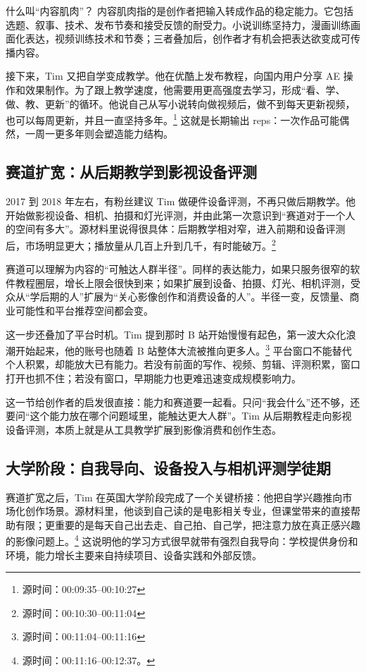 \documentclass[a4paper]{article}
\begin{document}
\begin{knowledgebox}{什么叫“内容肌肉”？}
内容肌肉指的是创作者把输入转成作品的稳定能力。它包括选题、叙事、技术、发布节奏和接受反馈的耐受力。小说训练坚持力，漫画训练画面化表达，视频训练技术和节奏；三者叠加后，创作者才有机会把表达欲变成可传播内容。
\end{knowledgebox}

接下来，Tim 又把自学变成教学。他在优酷上发布教程，向国内用户分享 AE 操作和效果制作。为了跟上教学速度，他需要用更高强度去学习，形成“看、学、做、教、更新”的循环。他说自己从写小说转向做视频后，做不到每天更新视频，也可以每周更新，并且一直坚持多年。\footnote{源时间：00:09:35--00:10:27} 这就是长期输出 reps：一次作品可能偶然，一周一更多年则会塑造能力结构。

\subsection{赛道扩宽：从后期教学到影视设备评测}

2017 到 2018 年左右，有粉丝建议 Tim 做硬件设备评测，不再只做后期教学。他开始做影视设备、相机、拍摄和灯光评测，并由此第一次意识到“赛道对于一个人的空间有多大”。源材料里说得很具体：后期教学相对窄，进入前期和设备评测后，市场明显更大；播放量从几百上升到几千，有时能破万。\footnote{源时间：00:10:30--00:11:04}

赛道可以理解为内容的“可触达人群半径”。同样的表达能力，如果只服务很窄的软件教程圈层，增长上限会很快到来；如果扩展到设备、拍摄、灯光、相机评测，受众从“学后期的人”扩展为“关心影像创作和消费设备的人”。半径一变，反馈量、商业可能性和平台推荐空间都会变。

这一步还叠加了平台时机。Tim 提到那时 B 站开始慢慢有起色，第一波大众化浪潮开始起来，他的账号也随着 B 站整体大流被推向更多人。\footnote{源时间：00:11:04--00:11:16} 平台窗口不能替代个人积累，却能放大已有能力。若没有前面的写作、视频、剪辑、评测积累，窗口打开也抓不住；若没有窗口，早期能力也更难迅速变成规模影响力。

这一节给创作者的启发很直接：能力和赛道要一起看。只问“我会什么”还不够，还要问“这个能力放在哪个问题域里，能触达更大人群”。Tim 从后期教程走向影视设备评测，本质上就是从工具教学扩展到影像消费和创作生态。

\subsection{大学阶段：自我导向、设备投入与相机评测学徒期}

赛道扩宽之后，Tim 在英国大学阶段完成了一个关键桥接：他把自学兴趣推向市场化创作场景。源材料里，他谈到自己读的是电影相关专业，但课堂带来的直接帮助有限；更重要的是每天自己出去走、自己拍、自己学，把注意力放在真正感兴趣的影像问题上。\footnote{源时间：00:11:16--00:12:37。} 这说明他的学习方式很早就带有强烈自我导向：学校提供身份和环境，能力增长主要来自持续项目、设备实践和外部反馈。
\end{document}
